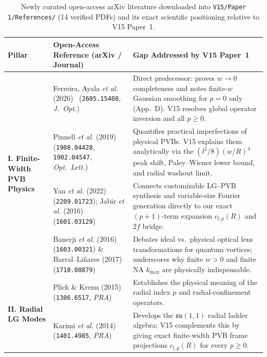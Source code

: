 \documentclass[10pt,letterpaper]{article}
\begin{document}
\begin{table}[t]
\centering
\caption{Newly curated open-access arXiv literature downloaded into \texttt{V15/Paper 1/References/} (14 verified PDFs) and its exact scientific positioning relative to V15 Paper~1.}
\label{tab:p1_refs}
\scriptsize
\renewcommand{\arraystretch}{1.16}
\begin{tabularx}{\linewidth}{@{}l>{\raggedright\arraybackslash}p{4.6cm}>{\raggedright\arraybackslash}X@{}}
\toprule
\textbf{Pillar} & \textbf{Open-Access Reference (arXiv / Journal)} & \textbf{Gap Addressed by V15 Paper~1} \\
\midrule
\multirow{4}{*}{\textbf{I. Finite-Width PVB Physics}}
  & Ferreira, Ayala \emph{et al.} (2026)~\cite{Ferreira2026} (\texttt{2605.15408}, \emph{J.\ Opt.}) & Direct predecessor: proves $w\to 0$ completeness and notes finite-$w$ Gaussian smoothing for $p=0$ only (App.~D). V15 resolves global operator inversion and all $p\ge 0$. \\
  & Pinnell \emph{et al.} (2019)~\cite{Pinnell2019HowPerfect,Pinnell2019Quantitative} (\texttt{1908.04428}, \texttt{1902.04547}, \emph{Opt.\ Lett.}) & Quantifies practical imperfections of physical PVBs. V15 explains them analytically via the $(l^2/8)(w/R)^4$ peak shift, Paley--Wiener lower bound, and radial washout limit. \\
  & Yan \emph{et al.} (2022)~\cite{Yan2022Customizable} (\texttt{2209.01723}); Jabir \emph{et al.} (2016)~\cite{Jabir2016Variable} (\texttt{1601.03129}) & Connects customizable LG--PVB synthesis and variable-size Fourier generation directly to our exact $(p+1)$-term expansion $c_{l,p}(R)$ and $2f$ bridge. \\
  & Banerji \emph{et al.} (2016)~\cite{Banerji2016} (\texttt{1603.00321}) \& Barral--Li\~nares (2017)~\cite{Barral2017} (\texttt{1710.08879}) & Debates ideal vs.\ physical optical lens transformations for quantum vortices; underscores why finite $w>0$ and finite NA $k_{\max}$ are physically indispensable. \\
\midrule
\multirow{2}{*}{\textbf{II. Radial LG Modes}}
  & Plick \& Krenn (2015)~\cite{Plick2015} (\texttt{1306.6517}, \emph{PRA}) & Establishes the physical meaning of the radial index $p$ and radial-confinement operators. \\
  & Karimi \emph{et al.} (2014)~\cite{Karimi2014} (\texttt{1401.4985}, \emph{PRA}) & Develops the $\mathfrak{su}(1,1)$ radial ladder algebra; V15 complements this by giving exact finite-width PVB frame projections $c_{l,p}(R)$ for every $p\ge 0$. \\

\end{tabularx}
\end{table}
\end{document}

